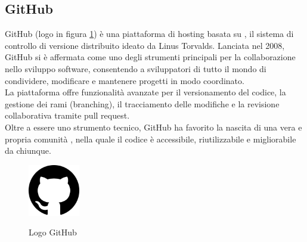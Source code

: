 \subsection{GitHub}
\label{subsec:github}
\noindent GitHub (logo in figura \ref{fig:logo_github}) è una piattaforma di hosting basata su , il sistema di controllo di versione distribuito ideato da Linus Torvalds. Lanciata nel 2008, GitHub si è affermata come uno degli strumenti principali per la collaborazione nello sviluppo software, consentendo a sviluppatori di tutto il mondo di condividere, modificare e mantenere progetti in modo coordinato. \\La piattaforma offre funzionalità avanzate per il versionamento del codice, la gestione dei rami (branching), il tracciamento delle modifiche e la revisione collaborativa tramite pull request. \\Oltre a essere uno strumento tecnico, GitHub ha favorito la nascita di una vera e propria comunità , nella quale il codice è accessibile, riutilizzabile e migliorabile da chiunque.
\begin{figure}[H]
    \centering
    \includegraphics[width=0.2\textwidth, alt={Logo GitHub}]{img/github.png}
    \caption[Logo GitHub]{Logo GitHub}\label{fig:logo_github}
\end{figure}

